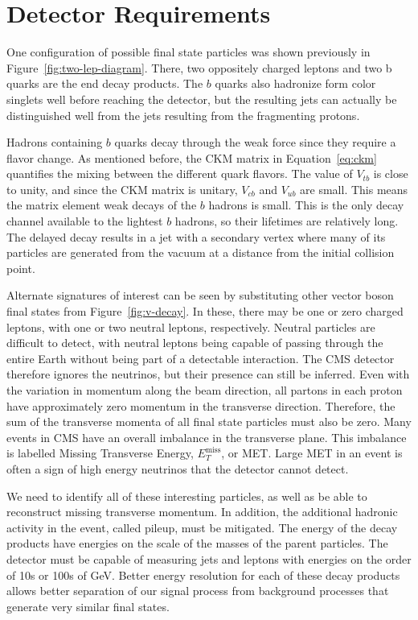 \section{Detector Requirements} \label{sec:requirements}

One configuration of possible final state particles was shown previously
in Figure~\ref{fig:two-lep-diagram}.
There, two oppositely charged leptons and two b quarks are the end decay products.
The $b$ quarks also hadronize form color singlets well before reaching the detector,
but the resulting jets can actually be distinguished well from the jets resulting
from the fragmenting protons.

Hadrons containing $b$ quarks decay through the weak force
since they require a flavor change.
As mentioned before, the CKM matrix in Equation~\ref{eq:ckm}
quantifies the mixing between the different quark flavors.
The value of $V_{tb}$ is close to unity, and since the CKM matrix is unitary,
$V_{cb}$ and $V_{ub}$ are small.
This means the matrix element weak decays of the $b$ hadrons is small.
This is the only decay channel available to the lightest $b$ hadrons,
so their lifetimes are relatively long.
The delayed decay results in a jet with a secondary vertex where many of its particles
are generated from the vacuum at a distance from the initial collision point.

Alternate signatures of interest can be seen by substituting other vector boson final states
from Figure~\ref{fig:v-decay}.
In these, there may be one or zero charged leptons,
with one or two neutral leptons, respectively.
Neutral particles are difficult to detect,
with neutral leptons being capable of passing through the entire Earth without
being part of a detectable interaction.
The CMS detector therefore ignores the neutrinos,
but their presence can still be inferred.
Even with the variation in momentum along the beam direction,
all partons in each proton have approximately zero momentum in the transverse direction.
Therefore, the sum of the transverse momenta of all final state particles must also be zero.
Many events in CMS have an overall imbalance in the transverse plane.
This imbalance is labelled Missing Transverse Energy, $E^\textrm{miss}_T$, or MET.
Large MET in an event is often a sign of high energy neutrinos
that the detector cannot detect.

We need to identify all of these interesting particles,
as well as be able to reconstruct missing transverse momentum.
In addition, the additional hadronic activity in the event, called pileup, must be mitigated.
The energy of the decay products have energies on the scale of
the masses of the parent particles.
The detector must be capable of measuring jets and leptons with energies on the
order of 10s or 100s of GeV.
Better energy resolution for each of these decay products allows better separation
of our signal process from background processes that generate very similar final states.

